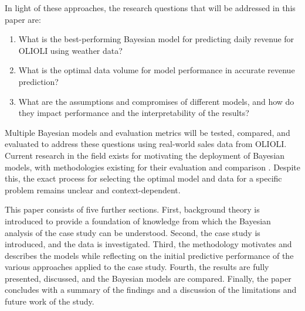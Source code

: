 
In light of these approaches, the research questions that will be addressed in
this paper are:

\begin{enumerate}
    \item What is the best-performing Bayesian model for predicting daily
      revenue for OLIOLI using weather data?
    \item What is the optimal data volume for model performance in accurate revenue prediction?
    \item What are the assumptions and compromises of different models, and how
      do they impact performance and the interpretability of the results?
\end{enumerate}

Multiple Bayesian models and evaluation metrics will be tested,
compared, and evaluated to address these questions using real-world
sales data from OLIOLI. Current research in the field exists for
motivating the deployment of Bayesian models, with methodologies
existing for their evaluation and comparison \cite{gelman}
\cite{statrethinking} \cite{puppies}. Despite this, the exact process
for selecting the optimal model and data for a specific problem
remains unclear and context-dependent.

This paper consists of five further sections. First, background theory is
introduced to provide a foundation of knowledge from which the Bayesian
analysis of the case study can be understood. Second, the case study is
introduced, and the data is investigated. Third, the methodology motivates and
describes the models while reflecting on the initial predictive performance of
the various approaches applied to the case study. Fourth, the results are fully
presented, discussed, and the Bayesian models are compared. Finally, the paper
concludes with a summary of the findings and a discussion of the limitations
and future work of the study.


